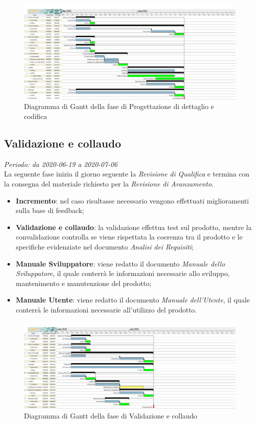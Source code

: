 \begin{figure}[H]
\centering
\includegraphics[scale=0.24]{./img/gantt/progettazione_dettaglio_codifica.png}
\caption{Diagramma di Gantt della fase di Progettazione di dettaglio e codifica}
\end{figure}

\subsection{Validazione e collaudo}
\textit{Periodo: da 2020-06-19 a 2020-07-06}\\
La seguente fase inizia il giorno seguente la \textit{Revisione di Qualifica} e termina con la consegna del materiale richiesto per la \textit{Revisione di Avanzamento}.
\begin{itemize}
\item \textbf{Incremento}: nel caso risultasse necessario vengono effettuati miglioramenti sulla base di feedback;
\item \textbf{Validazione e collaudo}: la validazione effettua test sul prodotto, mentre la convalidazione controlla se viene rispettata la coerenza tra il prodotto e le specifiche evidenziate nel documento \textit{Analisi dei Requisiti};
\item \textbf{Manuale Sviluppatore}: viene redatto il documento \textit{Manuale dello Sviluppatore}, il quale conterrà le informazioni necessarie allo sviluppo, mantenimento e manutenzione del prodotto;
\item \textbf{Manuale Utente}: viene redatto il documento \textit{Manuale dell'Utente}, il quale conterrà le informazioni necessarie all'utilizzo del prodotto.
\end{itemize}

\begin{figure}[H]
\centering
\includegraphics[scale=0.24]{./img/gantt/validazione_collaudo.png}
\caption{Diagramma di Gantt della fase di Validazione e collaudo}
\end{figure}